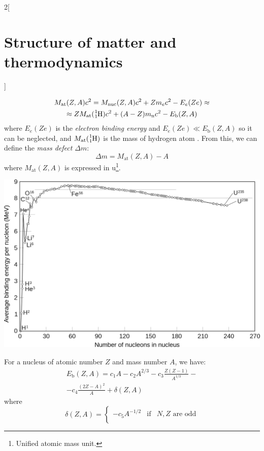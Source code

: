 \documentclass[../../../main.tex]{subfiles}
\begin{document}
\begin{multicols}{2}[\section{Structure of matter and thermodynamics}]
\begin{prop}
        \begin{multline*}
            M_\text{at}(Z,A)c^2=M_\text{nuc}(Z,A)c^2+Zm_ec^2-E_e(Ze)\approx\\\approx ZM_\text{at}(\ce{^1_1H})c^2+(A-Z)m_\text{n}c^2-E_\text{b}(Z,A)
        \end{multline*}
        where $E_e(Ze)$ is the \textit{electron binding energy} and $E_e(Ze)\ll E_\text{b}(Z,A)$ so it can be neglected, and $M_\text{at}(\ce{^1_1H})$ is the mass of hydrogen atom . From this, we can define the \textit{mass defect $\Delta m$}:
        $$\Delta m=M_\text{at}(Z,A)-A$$ where $M_\text{at}(Z,A)$ is expressed in u\footnote{Unified atomic mass unit.}.
    \end{prop}
    \begin{center}
        \begin{minipage}{\linewidth}
            \centering
            \includegraphics[width=\linewidth]{Images/Binding_energy.png}
        \end{minipage}
    \end{center}
    \begin{prop}
        For a nucleus of atomic number $Z$ and mass number $A$, we have:
        \begin{multline*}
            E_\text{b}(Z,A)=c_1A-c_2A^{2/3}-c_3\frac{Z(Z-1)}{A^{1/3}}-\\-c_4\frac{{(2Z-A)}^2}{A}+\delta(Z,A)
        \end{multline*}
        where
        $$\delta(Z,A)=\left\{
            \begin{array}{lll}
                -c_5A^{-1/2} & \text{if} & N, Z\text{ are odd}  \\

\end{array}$$
\end{prop}
\end{multicols}
\end{document}
